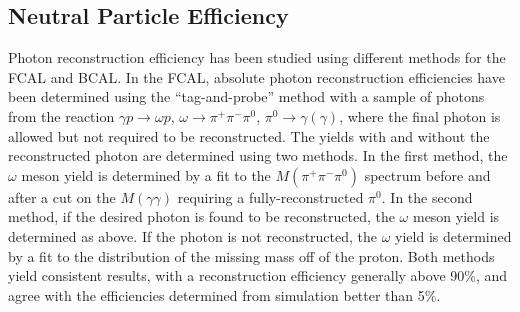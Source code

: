 \subsection{Neutral Particle Efficiency\label{sec:perfneutral}}




Photon reconstruction efficiency has been studied using different methods for the FCAL and BCAL.  In the FCAL, absolute photon reconstruction efficiencies have been determined using the ``tag-and-probe'' method with a sample of photons from the reaction $\gamma p \to \omega p$, $\omega \to \pi^+\pi^-\pi^0$, $\pi^0 \to \gamma (\gamma)$, where the final photon is allowed but not required to be reconstructed.  The yields with and without the reconstructed photon are determined using two methods.  In the first method, the $\omega$ meson yield is determined by a fit to the $M(\pi^+\pi^-\pi^0)$ spectrum before and after a cut on the $M(\gamma\gamma)$ requiring a fully-reconstructed $\pi^0$.  In the second method, if the desired photon is found to be reconstructed, the  $\omega$ meson yield is determined as above.  If the photon is not reconstructed, the $\omega$ yield is determined by a fit to the distribution of the missing mass off of the proton.  Both methods yield consistent results, with a reconstruction efficiency generally above 90\%, and agree with the efficiencies determined from simulation better than 5\%.


